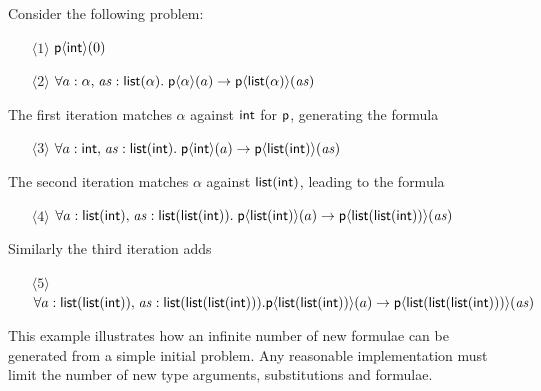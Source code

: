 \documentclass[runningheads]{llncs}
\begin{document}
\begin{examplex}\rm
Consider the following problem:
\begin{enumerate}
   \item[$\langle1\rangle$] \(\textsf{p}\langle \textsf{int}\rangle(0)\)
   \item[$\langle2\rangle$] \(\forall a: \alpha{,}\; \mathit{as}:\textsf{list}(\alpha){.}\; \textsf{p}\langle\alpha\rangle(a) \rightarrow \textsf{p}\langle \textsf{list}(\alpha)\rangle(\mathit{as})\)
\end{enumerate}
%
The first iteration matches \(\alpha\) against \(\textsf{int}\) for $\textsf{p}$, generating the formula
%
\begin{enumerate}
   \item[$\langle3\rangle$] \(\forall a: \textsf{int}{,}\; \mathit{as}:\textsf{list}(\textsf{int}){.}\; \textsf{p}\langle\textsf{int}\rangle(a) \rightarrow \textsf{p}\langle \textsf{list}(\textsf{int})\rangle(\mathit{as})\)
\end{enumerate}
%
The second iteration matches \(\alpha\) against \(\textsf{list}(\textsf{int})\), leading to the formula
%
\begin{enumerate}
   \item[$\langle4\rangle$] \(\forall a: \textsf{list}(\textsf{int}){,}\; \mathit{as}:\textsf{list}(\textsf{list}(\textsf{int})){.}\; \textsf{p}\langle\textsf{list}(\textsf{int})\rangle(a) \rightarrow \textsf{p}\langle \textsf{list}(\textsf{list}(\textsf{int}))\rangle(\mathit{as})\)
\end{enumerate}
%
Similarly the third iteration adds
%
\begin{enumerate}
   \item[$\langle5\rangle$]
         \( \forall a: \textsf{list}(\textsf{list}(\textsf{int})){,}\; \mathit{as}:\textsf{list}(\textsf{list}(\textsf{list}(\textsf{int}))){.} \\ \textsf{p}\langle\textsf{list}(\textsf{list}(\textsf{int}))\rangle(a) \rightarrow \textsf{p}\langle \textsf{list}(\textsf{list}(\textsf{list}(\textsf{int})))\rangle(\mathit{as})\)
\end{enumerate}

\end{examplex}

This example illustrates how an infinite number of new formulae can be generated from a simple initial problem.
Any reasonable implementation must limit the number of new type arguments, substitutions and formulae.
\end{document}
